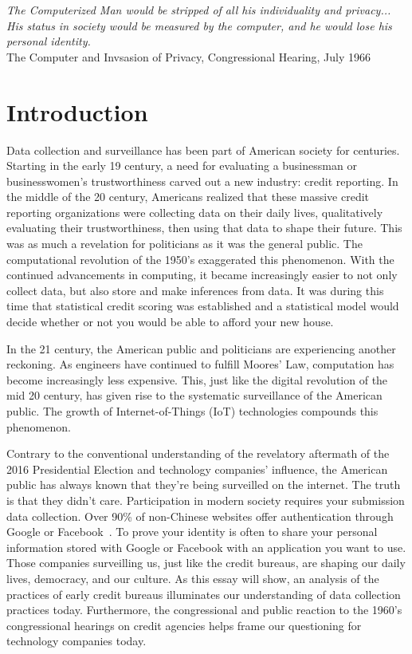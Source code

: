\begin{center}
\textit{
The Computerized Man would be stripped of all his individuality and privacy...
His status in society would be measured by the computer,
and he would lose his \\ personal identity.} \\
The Computer and Invsasion of Privacy, Congressional Hearing, July 1966
\end{center}

\section{Introduction}

Data collection and surveillance has been part of American society for
centuries. Starting in the early 19 century, a need for evaluating a
businessman or businesswomen's trustworthiness carved out a new industry:
credit reporting. In the middle of the 20 century, Americans realized
that these massive credit reporting organizations were collecting data on their
daily lives, qualitatively evaluating their trustworthiness, then using that
data to shape their future. This was as much a revelation for politicians as it
was the general public. The computational revolution of the 1950's exaggerated
this phenomenon. With the continued advancements in computing, it became
increasingly easier to not only collect data, but also store and make
inferences from data. It was during this time that statistical credit scoring
was established and a statistical model would decide whether or not you would
be able to afford your new house.

In the 21 century, the American public and politicians are experiencing
another reckoning. As engineers have continued to fulfill Moores' Law,
computation has become increasingly less expensive. This, just like the digital
revolution of the mid 20 century, has given rise to the systematic
surveillance of the American public. The growth of Internet-of-Things (IoT)
technologies compounds this phenomenon.

Contrary to the conventional understanding of the revelatory aftermath of the
2016 Presidential Election and technology companies' influence, the American
public has always known that they're being surveilled on the internet. The
truth is that they didn't care. Participation in modern society requires your
submission data collection. Over 90\% of non-Chinese websites offer
authentication through Google or Facebook~\cite{identity2018economist}. To
prove your identity is often to share your personal information stored with
Google or Facebook with an application you want to use. Those companies
surveilling us, just like the credit bureaus, are shaping our daily lives,
democracy, and our culture. As this essay will show, an analysis of the
practices of early credit bureaus illuminates our understanding of data
collection practices today. Furthermore, the congressional and public reaction
to the 1960's congressional hearings on credit agencies helps frame our
questioning for technology companies today.

